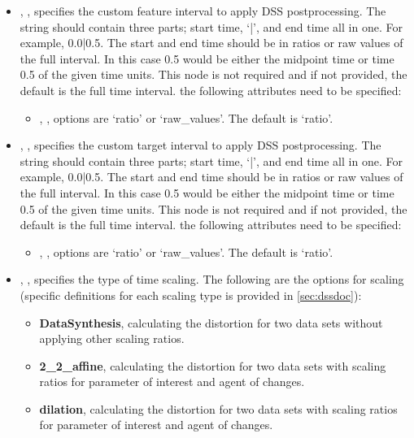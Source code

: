 \begin{itemize}
    \item {}, , specifies the custom feature interval to apply DSS postprocessing. The string should contain three parts; start time, `|', and end time all in one. For example, 0.0|0.5.
      The start and end time should be in ratios or raw values of the full interval. In this case 0.5 would be either the midpoint time or time 0.5 of the given time units. This node is not required and if not provided, the default is the full time interval.
      the following attributes need to be specified:
      \begin{itemize}
        \item {}, , options are `ratio' or `raw\_values'. The default is `ratio'.
      \end{itemize}
    \item {}, , specifies the custom target interval to apply DSS postprocessing. The string should contain three parts; start time, `|', and end time all in one. For example, 0.0|0.5.
      The start and end time should be in ratios or raw values of the full interval. In this case 0.5 would be either the midpoint time or time 0.5 of the given time units. This node is not required and if not provided, the default is the full time interval.
      the following attributes need to be specified:
      \begin{itemize}
        \item {}, , options are `ratio' or `raw\_values'. The default is `ratio'.
      \end{itemize}
    \item {}, , specifies the type of time scaling. The following are the options for scaling (specific definitions for each scaling type is provided in \ref{sec:dssdoc}):
      \begin{itemize}
        \item \textbf{DataSynthesis}, calculating the distortion for two data sets without applying other scaling ratios.
        \item \textbf{2\_2\_affine}, calculating the distortion for two data sets with scaling ratios for parameter of interest and agent of changes.
        \item \textbf{dilation}, calculating the distortion for two data sets with scaling ratios for parameter of interest and agent of changes.

\end{itemize}
\end{itemize}
